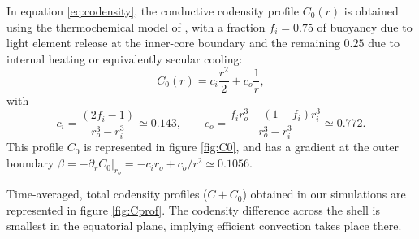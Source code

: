 \documentclass[12pt, a4paper]{article}
\begin{document}
In equation \ref{eq:codensity}, the conductive codensity profile $C_0(r)$ is obtained using the thermochemical model of \citet{aubert2009}, 
with a fraction $f_i = 0.75$ of buoyancy due to light element release at the inner-core boundary and the remaining $0.25$ due to internal heating or equivalently secular cooling:
\begin{equation}
C_0(r) =  c_i \frac{r^2}{2} + c_o \frac{1}{r},   \label{eq:C0}
\end{equation}
with
\begin{equation}
c_i = \frac{(2f_i-1)}{r_o^3 - r_i^3} \simeq 0.143, \quad \quad c_o = \frac{f_i r_o^3 - (1-f_i) r_i^3}{r_o^3 - r_i^3} \simeq 0.772.
\end{equation}
This profile $C_0$ is represented in figure \ref{fig:C0}, and has a gradient at the outer boundary $\beta = -\partial_r C_0|_{r_o} = -c_i r_o + c_o/r^2 \simeq 0.1056$.


Time-averaged, total codensity profiles ($C+C_0$) obtained in our simulations are represented in figure \ref{fig:Cprof}.
The codensity difference across the shell is smallest in the equatorial plane, implying efficient convection takes place there.


%
%
\end{document}
